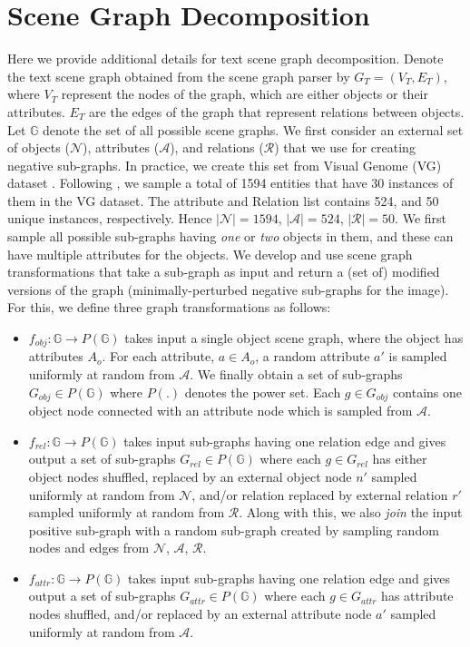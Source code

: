 \documentclass[11pt]{article}
\begin{document}
\section{Scene Graph Decomposition}
\label{sg_decomp}
Here we provide additional details for text scene graph decomposition. Denote the text scene graph obtained from the scene graph parser by $G_T = (V_T, E_T)$, where $V_T$ represent the nodes of the graph, which are either objects or their attributes. $E_T$ are the edges of the graph that represent relations between objects. Let $\mathbb{G}$ denote the set of all possible scene graphs. We first consider an external set of objects ($\mathcal{N}$), attributes ($\mathcal{A}$), and relations ($\mathcal{R}$) that we use for creating negative sub-graphs. In practice, we create this set from Visual Genome (VG) dataset \citep{krishnavisualgenome}. Following \citet{Zhang_2021_CVPR}, we sample a total of 1594 entities that have 30 instances of them in the VG dataset. The attribute and Relation list contains 524, and 50 unique instances, respectively. Hence $|\mathcal{N}| = 1594$, $|\mathcal{A}| = 524$, $|\mathcal{R}| = 50$. We first sample all possible sub-graphs having \textit{one} or \textit{two} objects in them, and these can have multiple attributes for the objects. We develop and use scene graph transformations that take a sub-graph as input and return a (set of) modified versions of the graph (minimally-perturbed negative sub-graphs for the image). For this, we define three graph transformations as follows:
\begin{itemize}
    \item $f_{obj}: \mathbb{G} \longrightarrow P(\mathbb{G})$ takes input a single object scene graph, where the object has attributes $A_o$. For each attribute, $a\in{A_o}$, a random attribute $a'$ is sampled uniformly at random from $\mathcal{A}$. We finally obtain a set of sub-graphs $G_{obj} \in P(\mathbb{G})$ where $P(.)$ denotes the power set. Each $g \in G_{obj}$ contains one object node connected with an attribute node which is sampled from $\mathcal{A}$.
    \item $f_{rel}: \mathbb{G} \longrightarrow P(\mathbb{G})$ takes input sub-graphs having one relation edge and gives output a set of sub-graphs $G_{rel} \in P(\mathbb{G})$ where each $g \in G_{rel}$ has either object nodes shuffled,  replaced by an external object node $n'$ sampled uniformly at random from $\mathcal{N}$, and/or relation replaced by external relation $r'$ sampled uniformly at random from $\mathcal{R}$. Along with this, we also \textit{join} the input positive sub-graph with a random sub-graph created by sampling random nodes and edges from $\mathcal{N}$, $\mathcal{A}$, $\mathcal{R}$.
    \item $f_{attr}: \mathbb{G} \longrightarrow P(\mathbb{G})$ takes input sub-graphs having one relation edge and gives output a set of sub-graphs $G_{attr} \in P(\mathbb{G})$ where each $g \in G_{attr}$ has attribute nodes shuffled, and/or replaced by an external attribute node $a'$ sampled uniformly at random from $\mathcal{A}$.
\end{itemize}
\end{document}
